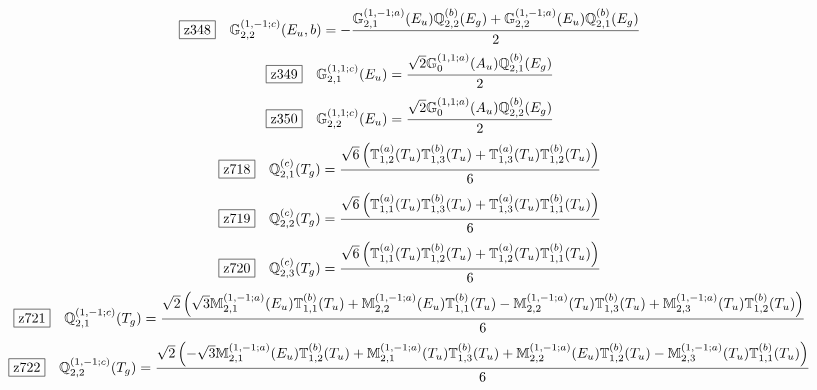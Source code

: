 \documentclass[fleqn,10pt,landscape]{jsarticle}
\begin{document}
\begin{dmath*}
\hspace*{3mm}\fbox{z348}\quad \mathbb{G}_{2,2}^{(1,-1;c)}(E_{u},b)=- \frac{\mathbb{G}_{2,1}^{(1,-1;a)}(E_{u}) \mathbb{Q}_{2,2}^{(b)}(E_{g}) + \mathbb{G}_{2,2}^{(1,-1;a)}(E_{u}) \mathbb{Q}_{2,1}^{(b)}(E_{g})}{2}
\end{dmath*}
\begin{dmath*}
\hspace*{3mm}\fbox{z349}\quad \mathbb{G}_{2,1}^{(1,1;c)}(E_{u})=\frac{\sqrt{2} \mathbb{G}_{0}^{(1,1;a)}(A_{u}) \mathbb{Q}_{2,1}^{(b)}(E_{g})}{2}
\end{dmath*}
\begin{dmath*}
\hspace*{3mm}\fbox{z350}\quad \mathbb{G}_{2,2}^{(1,1;c)}(E_{u})=\frac{\sqrt{2} \mathbb{G}_{0}^{(1,1;a)}(A_{u}) \mathbb{Q}_{2,2}^{(b)}(E_{g})}{2}
\end{dmath*}
\begin{dmath*}
\hspace*{3mm}\fbox{z718}\quad \mathbb{Q}_{2,1}^{(c)}(T_{g})=\frac{\sqrt{6} \left(\mathbb{T}_{1,2}^{(a)}(T_{u}) \mathbb{T}_{1,3}^{(b)}(T_{u}) + \mathbb{T}_{1,3}^{(a)}(T_{u}) \mathbb{T}_{1,2}^{(b)}(T_{u})\right)}{6}
\end{dmath*}
\begin{dmath*}
\hspace*{3mm}\fbox{z719}\quad \mathbb{Q}_{2,2}^{(c)}(T_{g})=\frac{\sqrt{6} \left(\mathbb{T}_{1,1}^{(a)}(T_{u}) \mathbb{T}_{1,3}^{(b)}(T_{u}) + \mathbb{T}_{1,3}^{(a)}(T_{u}) \mathbb{T}_{1,1}^{(b)}(T_{u})\right)}{6}
\end{dmath*}
\begin{dmath*}
\hspace*{3mm}\fbox{z720}\quad \mathbb{Q}_{2,3}^{(c)}(T_{g})=\frac{\sqrt{6} \left(\mathbb{T}_{1,1}^{(a)}(T_{u}) \mathbb{T}_{1,2}^{(b)}(T_{u}) + \mathbb{T}_{1,2}^{(a)}(T_{u}) \mathbb{T}_{1,1}^{(b)}(T_{u})\right)}{6}
\end{dmath*}
\begin{dmath*}
\hspace*{3mm}\fbox{z721}\quad \mathbb{Q}_{2,1}^{(1,-1;c)}(T_{g})=\frac{\sqrt{2} \left(\sqrt{3} \mathbb{M}_{2,1}^{(1,-1;a)}(E_{u}) \mathbb{T}_{1,1}^{(b)}(T_{u}) + \mathbb{M}_{2,2}^{(1,-1;a)}(E_{u}) \mathbb{T}_{1,1}^{(b)}(T_{u}) - \mathbb{M}_{2,2}^{(1,-1;a)}(T_{u}) \mathbb{T}_{1,3}^{(b)}(T_{u}) + \mathbb{M}_{2,3}^{(1,-1;a)}(T_{u}) \mathbb{T}_{1,2}^{(b)}(T_{u})\right)}{6}
\end{dmath*}
\begin{dmath*}
\hspace*{3mm}\fbox{z722}\quad \mathbb{Q}_{2,2}^{(1,-1;c)}(T_{g})=\frac{\sqrt{2} \left(- \sqrt{3} \mathbb{M}_{2,1}^{(1,-1;a)}(E_{u}) \mathbb{T}_{1,2}^{(b)}(T_{u}) + \mathbb{M}_{2,1}^{(1,-1;a)}(T_{u}) \mathbb{T}_{1,3}^{(b)}(T_{u}) + \mathbb{M}_{2,2}^{(1,-1;a)}(E_{u}) \mathbb{T}_{1,2}^{(b)}(T_{u}) - \mathbb{M}_{2,3}^{(1,-1;a)}(T_{u}) \mathbb{T}_{1,1}^{(b)}(T_{u})\right)}{6}
\end{dmath*}
\end{document}
